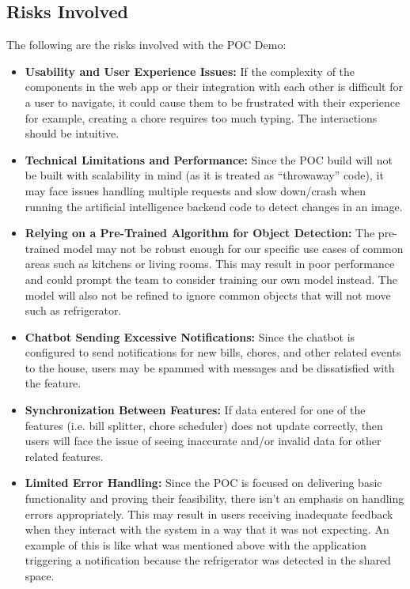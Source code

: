 \documentclass[12pt, titlepage]{article}
\begin{document}
\subsection{Risks Involved}
The following are the risks involved with the POC Demo:
\begin{itemize}
\item \textbf{Usability and User Experience Issues:} If the complexity of the components in the web app or their integration with each other is difficult for a user to navigate, it could cause them to be frustrated with their experience for example, creating a chore requires too much typing. The interactions should be intuitive. 
\item \textbf{Technical Limitations and Performance:} Since the POC build will not be built with scalability in mind (as it is treated as “throwaway” code), it may face issues handling multiple requests and slow down/crash when running the artificial intelligence backend code to detect changes in an image.
\item \textbf{Relying on a Pre-Trained Algorithm for Object Detection:} The pre-trained model may not be robust enough for our specific use cases of common areas such as kitchens or living rooms. This may result in poor performance and could prompt the team to consider training our own model instead. The model will also not be refined to ignore common objects that will not move such as refrigerator. 
\item \textbf{Chatbot Sending Excessive Notifications:} Since the chatbot is configured to send notifications for new bills, chores, and other related events to the house, users may be spammed with messages and be dissatisfied with the feature.
\item \textbf{Synchronization Between Features:} If data entered for one of the features (i.e. bill splitter, chore scheduler) does not update correctly, then users will face the issue of seeing inaccurate and/or invalid data for other related features.
\item \textbf{Limited Error Handling:} Since the POC is focused on delivering basic functionality and proving their feasibility, there isn’t an emphasis on handling errors appropriately. This may result in users receiving inadequate feedback when they interact with the system in a way that it was not expecting. An example of this is like what was mentioned above with the application triggering a notification because the refrigerator was detected in the shared space.
\end{itemize}
\end{document}
